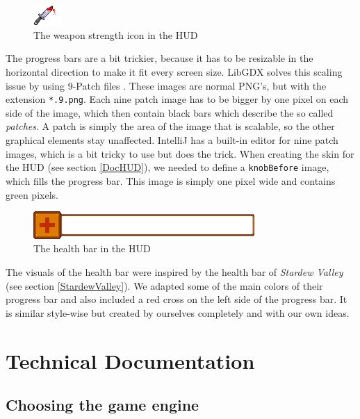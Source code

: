 \documentclass[12p]{article}
\begin{document}
\begin{figure}[ht]
  \center
  \includegraphics[width=0.1\textwidth]{Documentation/weapon_strength_icon.png}
  \caption{The weapon strength icon in the HUD}
  \label{fig:hud_weapon_strength_icon}
\end{figure}

The progress bars are a bit trickier, because it has to be resizable in the horizontal direction to make it fit every screen size. LibGDX solves this scaling issue by using 9-Patch files \cite{NinePatchImage}. These images are normal PNG's, but with the extension \texttt{*.9.png}. Each nine patch image has to be bigger by one pixel on each side of the image, which then contain black bars which describe the so called \emph{patches}. A patch is simply the area of the image that is scalable, so the other graphical elements stay unaffected. IntelliJ has a built-in editor for nine patch images, which is a bit tricky to use but does the trick. When creating the skin for the HUD (see section \ref{DocHUD}), we needed to define a \texttt{knobBefore} image, which fills the progress bar. This image is simply one pixel wide and contains green pixels.

\begin{figure}[ht]
  \center
  \includegraphics[width=0.75\textwidth]{Documentation/healthbar.png}
  \caption{The health bar in the HUD}
  \label{fig:hud_health_bar}
\end{figure}

The visuals of the health bar were inspired by the health bar of \emph{Stardew Valley} (see section \ref{StardewValley}). We adapted some of the main colors of their progress bar and also included a red cross on the left side of the progress bar. It is similar style-wise but created by ourselves completely and with our own ideas.

\newpage
\section{Technical Documentation}


\subsection{Choosing the game engine} \label{DocGameEngine}
\end{document}
